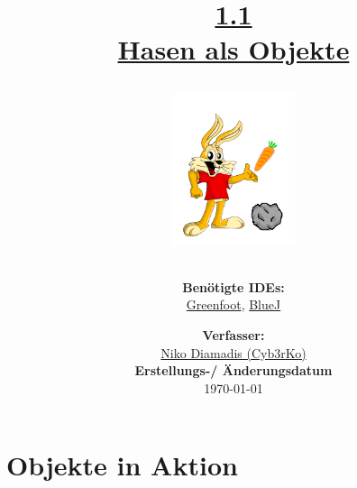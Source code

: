 \documentclass{scrartcl}   %
\begin{document}
\title{\huge{\href{https://www.inf-schule.de/oop/java/klassen/grundbegriffe}{1.1\\Hasen als Objekte}}\\
\vspace{0.5cm}
\begin{figure}[ht]
	\centering
	\includegraphics[height=4.5cm]{Hasen_als_Objekte.png}
\end{figure}
\vspace{0.7cm}}

\author{\textbf{Benötigte IDEs:}\\
\href{https://www.greenfoot.org/}{Greenfoot}, \href{https://www.bluej.org/}{BlueJ}
\vspace{1cm}}

\date{\textbf{Verfasser:}\\
\href{https://cyb3rko.de}{Niko Diamadis (Cyb3rKo)}\\
\vspace{1cm}
\textbf{Erstellungs-/ Änderungsdatum}\\
\today\enlargethispage{4cm}}

\doublespacing

\maketitle\thispagestyle{empty}

\cleardoublepage

\setcounter{page}{1}
\tableofcontents


\newpage
{}  %

\section{Objekte in Aktion}
\end{document}
